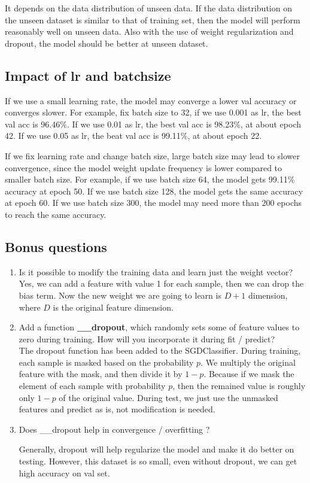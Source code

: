 \documentclass[a4paper, 12pt]{article}
\begin{document}
It depends on the data distribution of unseen data.
If the data distribution on the unseen dataset is similar to that of training set,
then the model will perform reasonably well on unseen data.
Also with the use of weight regularization and dropout, the model should be better at unseen dataset.

\subsection{Impact of lr and batchsize}

If we use a small learning rate,
the model may converge a lower val accuracy or converges slower.
For example, fix batch size to 32, if we use 0.001 as lr, the best val acc is 96.46\%.
If we use 0.01 as lr, the best val acc is 98.23\%, at about epoch 42.
If we use 0.05 as lr, the beat val acc is 99.11\%, at about epoch 22.

If we fix learning rate and change batch size, large batch size may lead to slower convergence,
since the model weight update frequency is lower compared to smaller batch size.
For example, if we use batch size 64, the model gets 99.11\% accuracy at epoch 50.
If we use batch size 128, the model gets the same accuracy at epoch 60.
If we use batch size 300, the model may need more than 200 epochs to reach the same accuracy.

\subsection{Bonus questions}

\begin{enumerate}
    \item Is it possible to modify the training data and learn just the weight vector?\\

    Yes, we can add a feature with value 1 for each sample, then we can drop the bias term.
    Now the new weight we are going to learn is $D + 1$ dimension, where $D$ is the original feature dimension.

    \item Add a function \textbf{\_\_dropout}, which randomly sets some of feature values to zero during training.
        How will you incorporate it during fit / predict? \\

    The dropout function has been added to the SGDClassifier.
    During training, each sample is masked based on the probability $p$.
    We multiply the original feature with the mask, and then divide it by $1-p$.
    Because if we mask the element of each sample with probability $p$,
    then the remained value is roughly only $1-p$ of the original value.
    During test, we just use the unmasked features and predict as is, not modification is needed.

    \item  Does \_\_dropout help in convergence / overfitting ?

    Generally, dropout will help regularize the model and make it do better on testing.
    However, this dataset is so small, even without dropout, we can get high accuracy on val set.

\end{enumerate}
\end{document}
